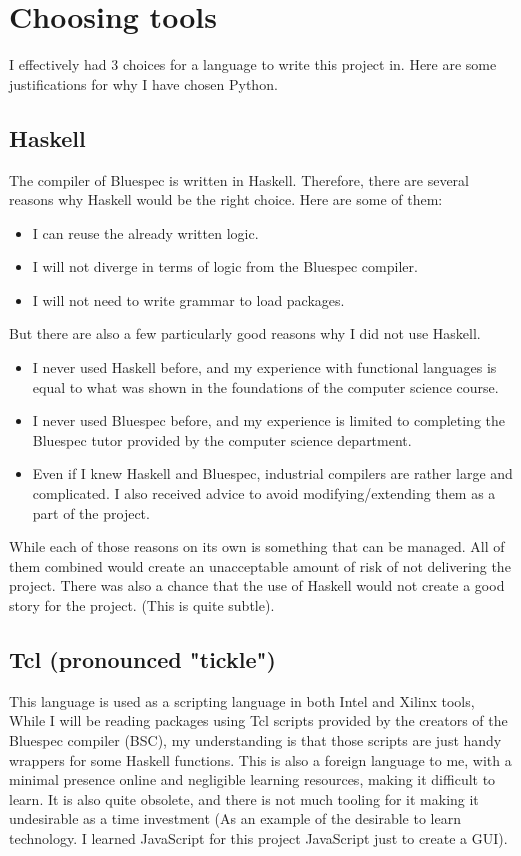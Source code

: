 \documentclass[12pt]{report}
\begin{document}
\section{Choosing tools}
I effectively had 3 choices for a language to write this project in. Here are some justifications for why I have chosen Python.   

\subsection{Haskell}  

The compiler of Bluespec is written in Haskell. Therefore, there are several reasons why Haskell would be the right choice. Here are some of them:  
\begin{itemize}  
   \item I can reuse the already written logic.  
   \item I will not diverge in terms of logic from the Bluespec compiler.  
   \item I will not need to write grammar to load packages.  
\end{itemize}  
But there are also a few particularly good reasons why I did not use Haskell.  
\begin{itemize}  

   \item I never used Haskell before, and my experience with functional languages is equal to what was shown in the foundations of the computer science course.  

   \item I never used Bluespec before, and my experience is limited to completing the Bluespec tutor provided by the computer science department.  

   \item Even if I knew Haskell and Bluespec, industrial compilers are rather large and complicated. I also received advice to avoid modifying/extending them as a part of the project.  

\end{itemize}  

While each of those reasons on its own is something that can be managed. All of them combined would create an unacceptable amount of risk of not delivering the project. There was also a chance that the use of Haskell would not create a good story for the project. (This is quite subtle). 

\subsection{Tcl (pronounced "tickle")}
This language is used as a scripting language in both Intel and Xilinx tools, While I will be reading packages using Tcl scripts provided by the creators of the Bluespec compiler (BSC), my understanding is that those scripts are just handy wrappers for some Haskell functions. This is also a foreign language to me, with a minimal presence online and negligible learning resources, making it difficult to learn. It is also quite obsolete, and there is not much tooling for it making it undesirable as a time investment (As an example of the desirable to learn technology. I learned JavaScript for this project JavaScript just to create a GUI). 
\end{document}
